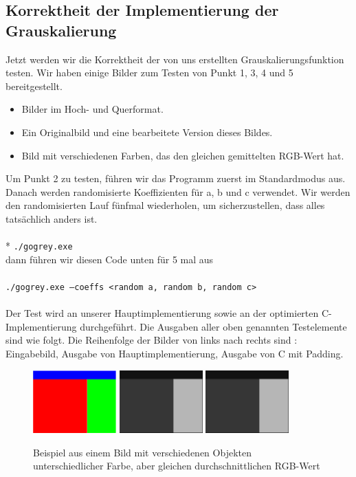 \documentclass[course=asp]{aspdoc}
\begin{document}
\subsection{Korrektheit der Implementierung der Grauskalierung}
Jetzt werden wir die Korrektheit der von uns erstellten Grauskalierungsfunktion testen. Wir haben einige Bilder zum Testen von Punkt 1, 3, 4 und 5 bereitgestellt.
\begin{itemize}
    \item Bilder im Hoch- und Querformat.
    \item Ein Originalbild und eine bearbeitete Version dieses Bildes.
    \item Bild mit verschiedenen Farben, das den gleichen gemittelten RGB-Wert hat.
\end{itemize}
Um Punkt 2 zu testen, führen wir das Programm zuerst im Standardmodus aus. Danach werden randomisierte Koeffizienten für a, b und c verwendet. Wir werden den randomisierten Lauf fünfmal wiederholen, um sicherzustellen, dass alles tatsächlich anders ist.\\
\\*
\texttt{./gogrey.exe} \\

dann führen wir diesen Code unten für 5 mal aus\\\\
\texttt{./gogrey.exe --coeffs <random a, random b, random c>} \\
\\
Der Test wird an unserer Hauptimplementierung sowie an der optimierten C-Implementierung durchgeführt. Die Ausgaben aller oben genannten Testelemente sind wie folgt. Die Reihenfolge der Bilder von links nach rechts sind : Eingabebild, Ausgabe von Hauptimplementierung, Ausgabe von C mit Padding.
\begin{figure}[h]
    \centering
    \includegraphics[width=3.2cm]{graphics/rgbcolor.png}
    \quad
    \includegraphics[width=3.2cm]{graphics/rgb.png}
    \quad
    \includegraphics[width=3.2cm]{graphics/rgbC.png}
    \caption{Beispiel aus einem Bild mit verschiedenen Objekten unterschiedlicher Farbe, aber gleichen durchschnittlichen RGB-Wert}
    \label{fig:my_label}
\end{figure}
\end{document}
